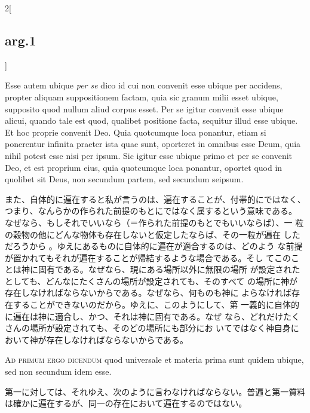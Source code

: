 \documentclass[paper=a4paper,fontsize=10pt,jafontsize=9pt,titlepage]{jlreq}
\begin{document}
\begin{paracol}{2}[\subsection{arg.1}]
\switchcolumn*

Esse autem ubique {\itshape per se} dico id cui non convenit esse ubique
 per accidens, propter aliquam suppositionem factam, quia sic granum
 milii  esset ubique, supposito quod nullum aliud corpus esset. Per se
 igitur convenit esse ubique alicui, quando tale est quod, qualibet
 positione facta, sequitur illud esse ubique. Et hoc proprie convenit
 Deo. Quia quotcumque loca ponantur, etiam si ponerentur infinita
 praeter ista quae sunt, oporteret in omnibus esse Deum, quia nihil
 potest esse nisi per ipsum. Sic igitur esse ubique primo et per se
 convenit Deo, et est proprium eius, quia quotcumque loca ponantur,
 oportet quod in quolibet sit Deus, non secundum partem, sed secundum
 seipsum.

\switchcolumn

また、自体的に遍在すると私が言うのは、遍在することが、付帯的にではなく、
 つまり、なんらかの作られた前提のもとにではなく属するという意味である。
 なぜなら、もしそれでいいなら（＝作られた前提のもとでもいいならば）、一
 粒の穀物の他にどんな物体も存在しないと仮定したならば、その一粒が遍在
 しただろうから 。ゆえにあるものに自体的に遍在が適合するのは、どのよう
 な前提が置かれてもそれが遍在することが帰結するような場合である。そし
 てこのことは神に固有である。なぜなら、現にある場所以外に無限の場所
 が設定されたとしても、どんなにたくさんの場所が設定されても、そのすべて
 の場所に神が存在しなければならないからである。なぜなら、何ものも神に
 よらなければ存在することができないのだから。ゆえに、このようにして、第
 一義的に自体的に遍在は神に適合し、かつ、それは神に固有である。なぜ
 なら、どれだけたくさんの場所が設定されても、そのどの場所にも部分にお
 いてではなく神自身において神が存在しなければならないからである。

\switchcolumn*[\subsection{ad.1}]

{\scshape Ad primum ergo dicendum} quod universale et materia prima sunt
 quidem ubique, sed non secundum idem esse.

\switchcolumn

第一に対しては、それゆえ、次のように言わなければならない。普遍と第一質料
 は確かに遍在するが、同一の存在において遍在するのではない。

\switchcolumn*[\subsection{ad.2}]


\end{paracol}
\end{document}
